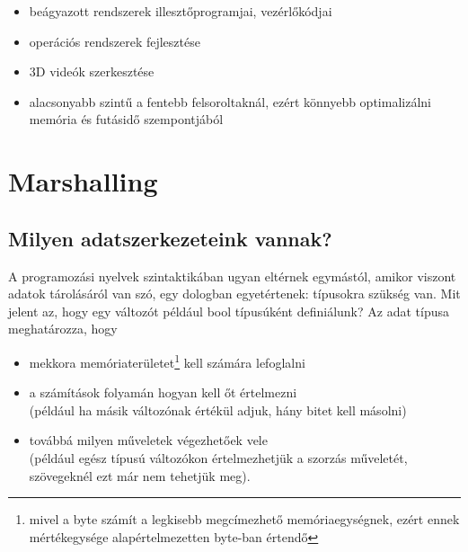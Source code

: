 \documentclass[tocnopagenum]{thesis-ekf}
\theoremstyle{definition}
\theoremstyle{remark}
\begin{document}
\begin{enumerate}
\begin{itemize}
			\item beágyazott rendszerek illesztőprogramjai, vezérlőkódjai
			\item operációs rendszerek fejlesztése
			\item 3D videók szerkesztése
			\item alacsonyabb szintű a fentebb felsoroltaknál, ezért könnyebb optimalizálni memória és futásidő szempontjából
			\cite{clang1}
		\end{itemize}
	\end{enumerate}\cite{proglanguages1}\cite{proglanguages2}
	
	\chapter{Marshalling}
	\section{Milyen adatszerkezeteink vannak?}
	A programozási nyelvek szintaktikában ugyan eltérnek egymástól, amikor viszont adatok tárolásáról van szó, egy dologban egyetértenek: típusokra szükség van. Mit jelent az, hogy egy változót például bool típusúként definiálunk? Az adat típusa meghatározza, hogy
	\begin{itemize}
		\item mekkora memóriaterületet\footnote{mivel a byte számít a legkisebb megcímezhető memóriaegységnek, ezért ennek mértékegysége alapértelmezetten byte-ban értendő} kell számára lefoglalni
		\item a számítások folyamán hogyan kell őt értelmezni\\(például ha másik változónak értékül adjuk, hány bitet kell másolni)
		\item továbbá milyen műveletek végezhetőek vele\\(például egész típusú változókon értelmezhetjük a szorzás műveletét, szövegeknél ezt már nem tehetjük meg).
	\end{itemize} \cite{adatszerkezetek_88}
\end{document}
